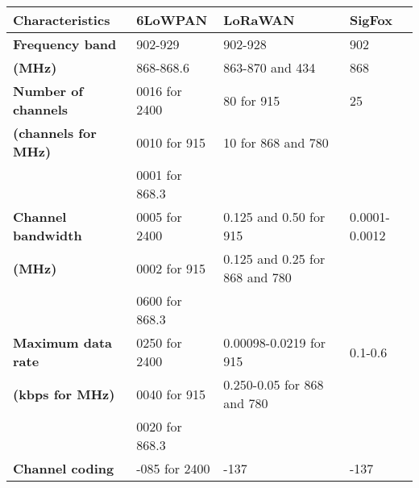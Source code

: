 \begin{table}[h!]
\begin{center}
	\begin{tabular}{l|l|l|l}
	\bf{Characteristics}                           & \bf{6LoWPAN}   & \bf{LoRaWAN}                    & \bf{SigFox}  \\\hline
	\bf{Frequency band}                            & 902-929        & 902-928                         & 902          \\
	\bf{\footnotesize{(MHz)}}                      & 868-868.6      & 863-870 and 434                 & 868          \\\hline
	\bf{Number of channels}                        & 0016 for 2400  & 80             for 915          & 25       \\
	\bf{\footnotesize{(channels for MHz)}}         & 0010 for 915   & 10             for 868 and 780  & \\
	\                                              & 0001 for 868.3 &                                 & \\\hline
	\bf{Channel bandwidth}                         & 0005 for 2400  & 0.125 and 0.50 for 915          & 0.0001-0.0012\\
	\bf{\footnotesize{(MHz)}}                      & 0002 for 915   & 0.125 and 0.25 for 868 and 780  & \\
	\                                              & 0600 for 868.3 &                                 & \\\hline
	\bf{Maximum data rate}                         & 0250 for 2400  & 0.00098-0.0219 for 915          & 0.1-0.6      \\
	\bf{\footnotesize{(kbps for MHz)}}             & 0040 for 915   & 0.250-0.05     for 868 and 780  & \\
	\                                              & 0020 for 868.3 &                                 & \\\hline
	\bf{Channel coding}                            & -085 for 2400  & -137                            & -137         \\

\end{tabular}
\end{center}
\end{table}
